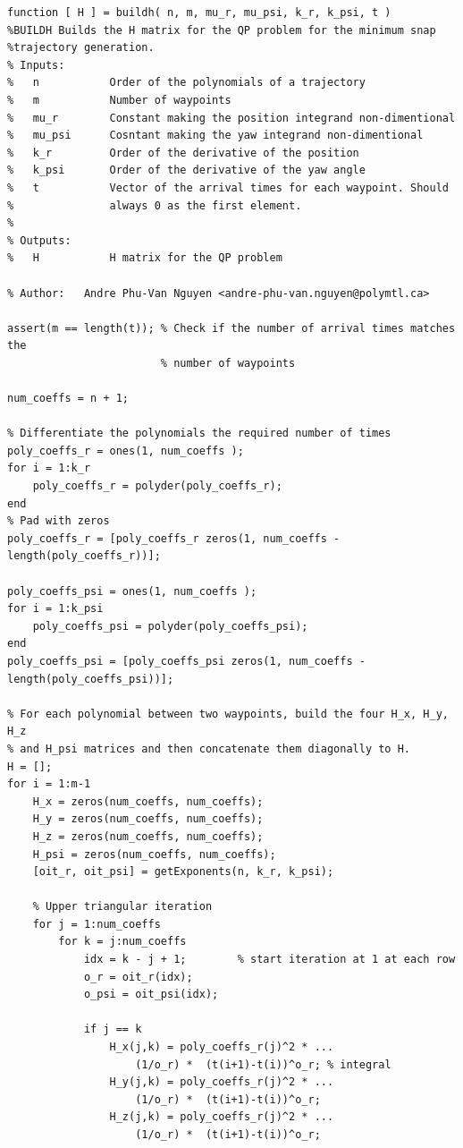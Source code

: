 \documentclass{article}
\begin{document}
\begin{lstlisting}[style=Matlab-editor]
function [ H ] = buildh( n, m, mu_r, mu_psi, k_r, k_psi, t )
%BUILDH Builds the H matrix for the QP problem for the minimum snap
%trajectory generation.
% Inputs:
%   n           Order of the polynomials of a trajectory
%   m           Number of waypoints
%   mu_r        Constant making the position integrand non-dimentional
%   mu_psi      Cosntant making the yaw integrand non-dimentional
%   k_r         Order of the derivative of the position
%   k_psi       Order of the derivative of the yaw angle
%   t           Vector of the arrival times for each waypoint. Should
%               always 0 as the first element.
%
% Outputs:
%   H           H matrix for the QP problem

% Author:   Andre Phu-Van Nguyen <andre-phu-van.nguyen@polymtl.ca>

assert(m == length(t)); % Check if the number of arrival times matches the 
                        % number of waypoints

num_coeffs = n + 1;

% Differentiate the polynomials the required number of times
poly_coeffs_r = ones(1, num_coeffs );
for i = 1:k_r
    poly_coeffs_r = polyder(poly_coeffs_r);
end
% Pad with zeros
poly_coeffs_r = [poly_coeffs_r zeros(1, num_coeffs - length(poly_coeffs_r))];

poly_coeffs_psi = ones(1, num_coeffs );
for i = 1:k_psi
    poly_coeffs_psi = polyder(poly_coeffs_psi);
end
poly_coeffs_psi = [poly_coeffs_psi zeros(1, num_coeffs - length(poly_coeffs_psi))];

% For each polynomial between two waypoints, build the four H_x, H_y, H_z
% and H_psi matrices and then concatenate them diagonally to H.
H = [];
for i = 1:m-1
    H_x = zeros(num_coeffs, num_coeffs);
    H_y = zeros(num_coeffs, num_coeffs);
    H_z = zeros(num_coeffs, num_coeffs);
    H_psi = zeros(num_coeffs, num_coeffs);
    [oit_r, oit_psi] = getExponents(n, k_r, k_psi);
    
    % Upper triangular iteration
    for j = 1:num_coeffs
        for k = j:num_coeffs
            idx = k - j + 1;        % start iteration at 1 at each row
            o_r = oit_r(idx);
            o_psi = oit_psi(idx);            
            
            if j == k
                H_x(j,k) = poly_coeffs_r(j)^2 * ...
                    (1/o_r) *  (t(i+1)-t(i))^o_r; % integral
                H_y(j,k) = poly_coeffs_r(j)^2 * ...
                    (1/o_r) *  (t(i+1)-t(i))^o_r; 
                H_z(j,k) = poly_coeffs_r(j)^2 * ...
                    (1/o_r) *  (t(i+1)-t(i))^o_r;
                

\end{lstlisting}
\end{document}
